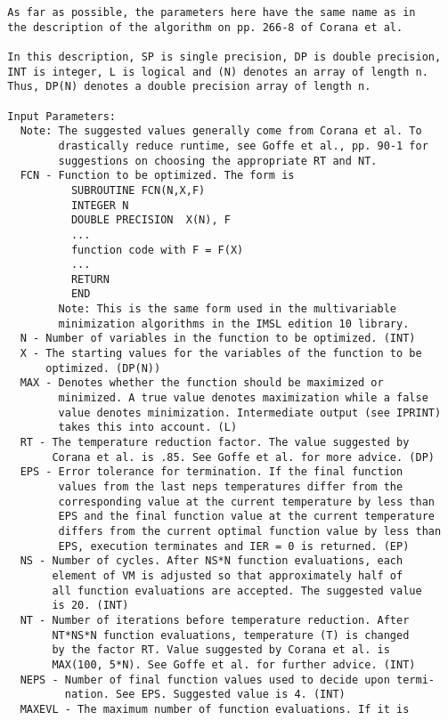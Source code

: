 \begin{verbatim}
  As far as possible, the parameters here have the same name as in
  the description of the algorithm on pp. 266-8 of Corana et al.

  In this description, SP is single precision, DP is double precision,
  INT is integer, L is logical and (N) denotes an array of length n.
  Thus, DP(N) denotes a double precision array of length n.

  Input Parameters:
    Note: The suggested values generally come from Corana et al. To
          drastically reduce runtime, see Goffe et al., pp. 90-1 for
          suggestions on choosing the appropriate RT and NT.
    FCN - Function to be optimized. The form is
            SUBROUTINE FCN(N,X,F)
            INTEGER N
            DOUBLE PRECISION  X(N), F
            ...
            function code with F = F(X)
            ...
            RETURN
            END
          Note: This is the same form used in the multivariable
          minimization algorithms in the IMSL edition 10 library.
    N - Number of variables in the function to be optimized. (INT)
    X - The starting values for the variables of the function to be
        optimized. (DP(N))
    MAX - Denotes whether the function should be maximized or
          minimized. A true value denotes maximization while a false
          value denotes minimization. Intermediate output (see IPRINT)
          takes this into account. (L)
    RT - The temperature reduction factor. The value suggested by
         Corana et al. is .85. See Goffe et al. for more advice. (DP)
    EPS - Error tolerance for termination. If the final function
          values from the last neps temperatures differ from the
          corresponding value at the current temperature by less than
          EPS and the final function value at the current temperature
          differs from the current optimal function value by less than
          EPS, execution terminates and IER = 0 is returned. (EP)
    NS - Number of cycles. After NS*N function evaluations, each
         element of VM is adjusted so that approximately half of
         all function evaluations are accepted. The suggested value
         is 20. (INT)
    NT - Number of iterations before temperature reduction. After
         NT*NS*N function evaluations, temperature (T) is changed
         by the factor RT. Value suggested by Corana et al. is
         MAX(100, 5*N). See Goffe et al. for further advice. (INT)
    NEPS - Number of final function values used to decide upon termi-
           nation. See EPS. Suggested value is 4. (INT)
    MAXEVL - The maximum number of function evaluations. If it is

\end{verbatim}
